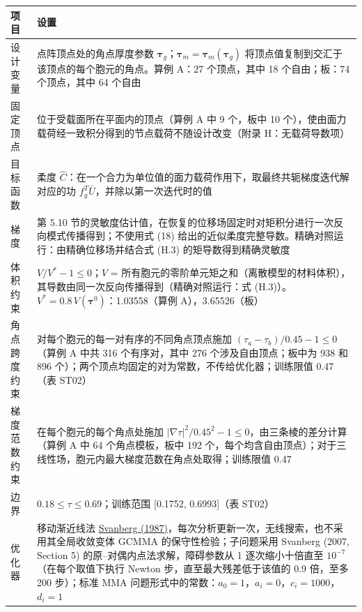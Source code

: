 \documentclass[preprint,12pt,authoryear]{elsarticle}
\begin{document}
{\small
\begin{longtable}[]{@{}
  >{\raggedright\arraybackslash}p{}
  >{\raggedright\arraybackslash}p{}@{}}
\toprule\noalign{}
\begin{minipage}[b]{\linewidth}\raggedright
项目
\end{minipage} & \begin{minipage}[b]{\linewidth}\raggedright
设置
\end{minipage} \\
\midrule\noalign{}
\endhead
\bottomrule\noalign{}
\endlastfoot
设计变量 & 点阵顶点处的角点厚度参数 \(\boldsymbol\tau_g\)；\(\boldsymbol\tau_m=\boldsymbol\tau_m(\boldsymbol\tau_g)\) 将顶点值复制到交汇于该顶点的每个胞元的角点。算例 A：27 个顶点，其中 18 个自由；板：74 个顶点，其中 64 个自由 \\
固定顶点 & 位于受载面所在平面内的顶点（算例 A 中 9 个，板中 10 个），使由面力载荷经一致积分得到的节点载荷不随设计改变（附录 H：无载荷导数项） \\
目标函数 & 柔度 \(\widehat C\)：在一个合力为单位值的面力载荷作用下，取最终共轭梯度迭代解对应的功 \(f_g^T\bar U\)，并除以第一次迭代时的值 \\
梯度 & 第 5.10 节的灵敏度估计值，在恢复的位移场固定时对矩积分进行一次反向模式传播得到；不使用式 (18) 给出的近似柔度完整导数。精确对照运行：由精确位移场并结合式 (H.3) 的矩导数得到精确灵敏度 \\
体积约束 & \(V/V^*-1\le0\)；\(V\) = 所有胞元的零阶单元矩之和（离散模型的材料体积），其导数由同一次反向传播得到（精确对照运行：式 (H.3)）。\(V^*=0.8\,V(\boldsymbol\tau^0)\)：1.03558（算例 A），3.65526（板） \\
角点跨度约束 & 对每个胞元的每一对有序的不同角点顶点施加 \((\tau_a-\tau_b)/0.45-1\le0\)（算例 A 中共 316 个有序对，其中 276 个涉及自由顶点；板中为 938 和 896 个）；两个顶点均固定的对为常数，不传给优化器；训练限值 0.47（表 ST02） \\
梯度范数约束 & 在每个胞元的每个角点处施加 \(\lvert\nabla\tau\rvert^2/0.45^2-1\le0\)，由三条棱的差分计算（算例 A 中 64 个角点模板，板中 192 个，每个均含自由顶点）；对于三线性场，胞元内最大梯度范数在角点处取得；训练限值 0.47 \\
边界 & \(0.18\le\tau\le0.69\)；训练范围 {[}0.1752, 0.6993{]}（表 ST02） \\
优化器 & 移动渐近线法 \href{https://doi.org/10.1002/nme.1620240207}{Svanberg (1987)}，每次分析更新一次，无线搜索，也不采用其全局收敛变体 GCMMA 的保守性检验；子问题采用 Svanberg (2007, Section 5) 的原--对偶内点法求解，障碍参数从 1 逐次缩小十倍直至 \(10^{-7}\)（在每个取值下执行 Newton 步，直至最大残差低于该值的 0.9 倍，至多 200 步）；标准 MMA 问题形式中的常数：\(a_0=1\)，\(a_i=0\)，\(c_i=1000\)，\(d_i=1\) \\

\end{longtable}}
\end{document}
